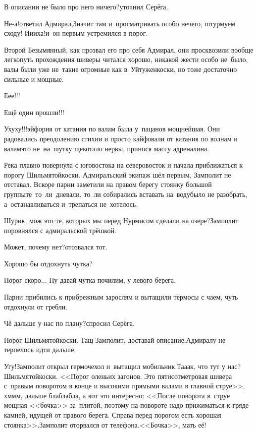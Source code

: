 \diagdash В описании не было про него ничего?\mdash уточнил Серёга.

\diagdash Не-а!\mdash ответил Адмирал,\mdash Значит там и~просматривать особо нечего, штурмуем сходу! И\sdash и\sdash и\sdash ха!\mdash и~он первым устремился в порог.

Второй Безымянный, как прозвал его про себя Адмирал, они просквозили вообще легко\mdash путь прохождения шиверы читался хорошо, никакой жести особо не~было, валы были уже не~такие огромные как в~Уйтуженкоски, но тоже достаточно сильные и мощные.

\diagdash Е\sdash е\sdash е!!!

\diagdash Ещё один прошли!!!

\diagdash У\sdash ху\sdash ху!!!\mdash эйфория от катания по валам была у~пацанов мощнейшая. Они радовались преодолению стихии и просто кайфовали от катания по волнам и валам\mdash это не~на~шутку щекотало нервы, принося массу адреналина.

Река плавно повернула с юго\sdash востока на северо\sdash восток и начала приближаться к порогу Шильмятойкоски. Адмиральский экипаж шёл первым, Замполит не отставал. Вскоре парни заметили на правом берегу стоянку большой группы\mdash те~то~ли~дневали, то~ли собирались вставать на~воду\mdash было не разобрать, а~останавливаться и~трепаться не~хотелось.

\diagdash Шурик, мож это те, которых мы перед Нурмисом сделали на озере?\mdash Замполит поровнялся с адмиральской трёшкой.

\diagdash Может, почему нет?\mdash отозвался тот.

\diagdash Хорошо бы отдохнуть чутка?

\diagdash Порог скоро$\ldots$ Ну давай чутка почилим, у левого берега.

Парни прибились к прибрежным зарослям и вытащили термосы с чаем, чуть отдохнули от гребли.

\diagdash Чё дальше у нас по плану?\mdash спросил Серёга.

\diagdash Порог Шильмятойкоски. Тащ Замполит, доставай описание.\mdash Адмиралу не терпелось идти дальше.

\diagdash Угу!\mdash Замполит открыл гермочехол и~вытащил мобильник.\mdash Та\sdash а\sdash ак, что тут у нас? Шильмятойкоски. <<Порог оленьих загонов. Это пятисотметровая шивера с~правым поворотом в конце и высокими прямыми валами в главной струе>>, хм\sdash м\sdash м, дальше бла\sdash бла\sdash бла, а вот это интересно: <<После поворота в~струе мощная <<бочка>> за~плитой, поэтому на повороте надо прижиматься к гряде камней, идущей от правого берега. Справа перед порогом есть хорошая стоянка>>.\mdash Замполит оторвался от телефона.\mdash <<Бочка>>, мать её!

